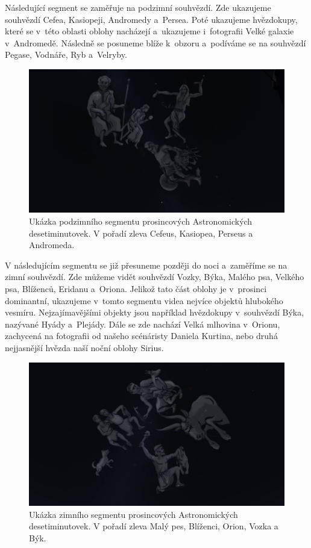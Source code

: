 \documentclass[12pt,a4paper,titlepage]{article}
\begin{document}
Následující segment se zaměřuje na podzimní souhvězdí. Zde ukazujeme souhvězdí Cefea, Kasiopeji, Andromedy a~Persea. Poté ukazujeme hvězdokupy, které se v~této oblasti oblohy nacházejí a~ukazujeme i~fotografii Velké galaxie v~Andromedě. Následně se posuneme blíže k~obzoru a~podíváme se na souhvězdí Pegase, Vodnáře, Ryb a~Velryby. 

\begin{figure}[H]
	\centering
	\includegraphics[width=.95\textwidth]{ac12_podzim.png}
	\caption{Ukázka podzimního segmentu prosincových Astronomických desetiminutovek. V pořadí zleva Cefeus, Kasiopea, Perseus a Andromeda.}\label{prac:ac12_podzim}
\end{figure}

V následujícím segmentu se již přesuneme později do noci a~zaměříme se na zimní souhvězdí. Zde můžeme vidět souhvězdí Vozky, Býka, Malého psa, Velkého psa, Blíženců, Eridanu a~Oriona. Jelikož tato část oblohy je v~prosinci dominantní, ukazujeme v~tomto segmentu videa nejvíce objektů hlubokého vesmíru. Nejzajímavějšími objekty jsou například hvězdokupy v~souhvězdí Býka, nazývané Hyády a~Plejády. Dále se zde nachází Velká mlhovina v~Orionu, zachycená na fotografii od našeho scénáristy Daniela Kurtina, nebo druhá nejjasnější hvězda naší noční oblohy Sirius.

\begin{figure}[H]
	\centering
	\includegraphics[width=.95\textwidth]{ac12_zima.png}
	\caption{Ukázka zimního segmentu prosincových Astronomických desetiminutovek. V pořadí zleva Malý pes, Blíženci, Orion, Vozka a Býk.}\label{prac:ac12_zima}
\end{figure}
\end{document}
